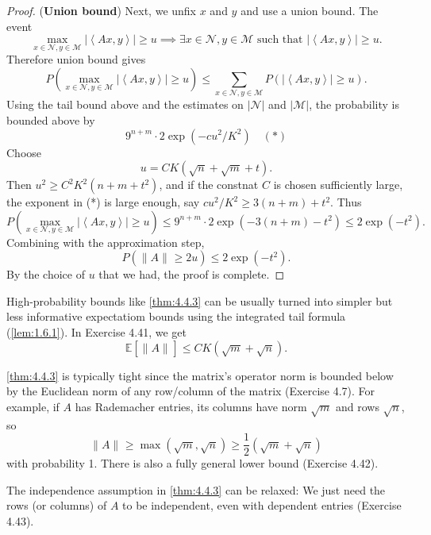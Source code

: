 \begin{proof}
(\textbf{Union bound}) Next, we unfix $x$ and $y$ and use a union bound. The event 
\[ \max_{x \in \mathcal{N}, y \in \mathcal{M}} \left| \left\langle Ax, y \right\rangle \right| \geq u 
\implies \exists x \in \mathcal{N}, y \in \mathcal{M} \text{ such that } 
\left| \left\langle Ax, y \right\rangle \right| \geq u. \]
Therefore union bound gives 
\[ P \left( \max_{x \in \mathcal{N}, y \in \mathcal{M}} \left| \left\langle Ax, y \right\rangle \right| 
\geq u \right) \leq \sum_{x \in \mathcal{N}, y \in \mathcal{M}}^{} 
P \left( \left|\left\langle Ax, y \right\rangle\right| \geq u \right). \]
Using the tail bound above and the estimates on $|\mathcal{N}|$ and $|\mathcal{M}|$, the probability is 
bounded above by 
\[ 9^{n + m} \cdot 2 \exp{(-cu^2 / K^2)} \quad (*) \]
Choose 
\[ u = CK(\sqrt{n} + \sqrt{m} + t). \]
Then $u^2 \geq C^2 K^2 (n + m + t^2)$, and if the constnat $C$ is chosen sufficiently large, the exponent 
in (*) is large enough, say $cu^2 / K^2 \geq 3(n + m) + t^2$. Thus 
\[ P \left( \max_{x \in \mathcal{N}, y \in \mathcal{M}} \left| \left\langle Ax, y \right\rangle \right| 
\geq u \right) \leq 9^{n + m} \cdot 2 \exp{(-3(n + m) - t^2)} \leq 2 \exp{(-t^2)}. \]
Combining with the approximation step, 
\[ P(\lVert A \rVert_{} \geq 2u) \leq 2 \exp{(-t^2)}. \]
By the choice of $u$ that we had, the proof is complete.
\end{proof}

\begin{remark}
\label{rmk:4.4.4}
High-probability bounds like \cref{thm:4.4.3} can be usually turned into simpler but less informative 
expectatiom bounds using the integrated tail formula (\cref{lem:1.6.1}). In Exercise 4.41, we get 
\[ \mathbb{E}[\lVert A \rVert_{}] \leq CK(\sqrt{m} + \sqrt{n}). \]
\end{remark}

\begin{remark}[Optimality]
\label{rmk:4.4.5}
\cref{thm:4.4.3} is typically tight since the matrix's operator norm is bounded below 
by the Euclidean norm of any row/column of the matrix (Exercise 4.7). For example, if $A$ has Rademacher 
entries, its columns have norm $\sqrt{m}$ and rows $\sqrt{n}$, so 
\[ \lVert A \rVert_{} \geq \max_{}(\sqrt{m}, \sqrt{n}) \geq \frac{1}{2}(\sqrt{m} + \sqrt{n}) \]
with probability 1. There is also a fully general lower bound (Exercise 4.42).
\end{remark}

\begin{remark}
The independence assumption in \cref{thm:4.4.3} can be relaxed: We just need the rows (or columns) of $A$ to be 
independent, even with dependent entries (Exercise 4.43).
\end{remark}


